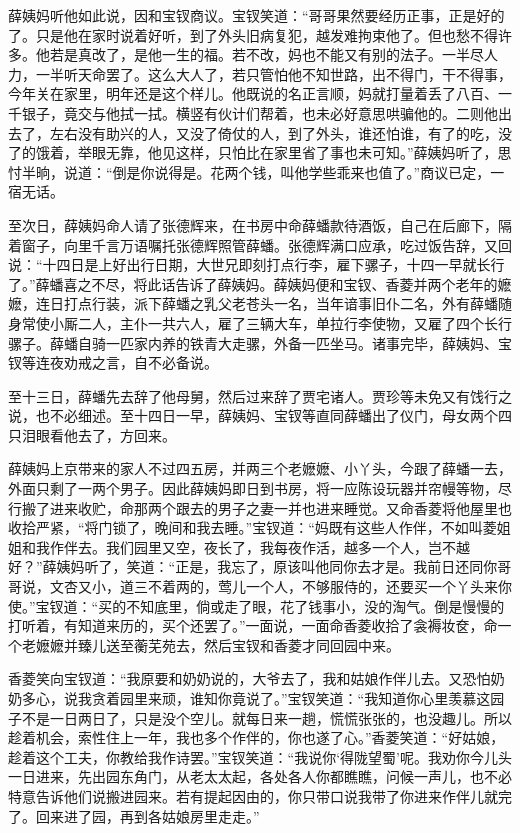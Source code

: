\documentclass[12pt,oneside]{book}
\begin{document}
薛姨妈听他如此说，因和宝钗商议。宝钗笑道：“哥哥果然要经历正事，正是好的了。只是他在家时说着好听，到了外头旧病复犯，越发难拘束他了。但也愁不得许多。他若是真改了，是他一生的福。若不改，妈也不能又有别的法子。一半尽人力，一半听天命罢了。这么大人了，若只管怕他不知世路，出不得门，干不得事，今年关在家里，明年还是这个样儿。他既说的名正言顺，妈就打量着丢了八百、一千银子，竟交与他拭一拭。横竖有伙计们帮着，也未必好意思哄骗他的。二则他出去了，左右没有助兴的人，又没了倚仗的人，到了外头，谁还怕谁，有了的吃，没了的饿着，举眼无靠，他见这样，只怕比在家里省了事也未可知。”薛姨妈听了，思忖半晌，说道：“倒是你说得是。花两个钱，叫他学些乖来也值了。”商议已定，一宿无话。

至次日，薛姨妈命人请了张德辉来，在书房中命薛蟠款待酒饭，自己在后廊下，隔着窗子，向里千言万语嘱托张德辉照管薛蟠。张德辉满口应承，吃过饭告辞，又回说：“十四日是上好出行日期，大世兄即刻打点行李，雇下骡子，十四一早就长行了。”薛蟠喜之不尽，将此话告诉了薛姨妈。薛姨妈便和宝钗、香菱并两个老年的嬷嬷，连日打点行装，派下薛蟠之乳父老苍头一名，当年谙事旧仆二名，外有薛蟠随身常使小厮二人，主仆一共六人，雇了三辆大车，单拉行李使物，又雇了四个长行骡子。薛蟠自骑一匹家内养的铁青大走骡，外备一匹坐马。诸事完毕，薛姨妈、宝钗等连夜劝戒之言，自不必备说。

至十三日，薛蟠先去辞了他母舅，然后过来辞了贾宅诸人。贾珍等未免又有饯行之说，也不必细述。至十四日一早，薛姨妈、宝钗等直同薛蟠出了仪门，母女两个四只泪眼看他去了，方回来。

薛姨妈上京带来的家人不过四五房，并两三个老嬷嬷、小丫头，今跟了薛蟠一去，外面只剩了一两个男子。因此薛姨妈即日到书房，将一应陈设玩器并帘幔等物，尽行搬了进来收贮，命那两个跟去的男子之妻一并也进来睡觉。又命香菱将他屋里也收拾严紧，“将门锁了，晚间和我去睡。”宝钗道：“妈既有这些人作伴，不如叫菱姐姐和我作伴去。我们园里又空，夜长了，我每夜作活，越多一个人，岂不越好？”薛姨妈听了，笑道：“正是，我忘了，原该叫他同你去才是。我前日还同你哥哥说，文杏又小，道三不着两的，莺儿一个人，不够服侍的，还要买一个丫头来你使。”宝钗道：“买的不知底里，倘或走了眼，花了钱事小，没的淘气。倒是慢慢的打听着，有知道来历的，买个还罢了。”一面说，一面命香菱收拾了衾褥妆奁，命一个老嬷嬷并臻儿送至蘅芜苑去，然后宝钗和香菱才同回园中来。

香菱笑向宝钗道：“我原要和奶奶说的，大爷去了，我和姑娘作伴儿去。又恐怕奶奶多心，说我贪着园里来顽，谁知你竟说了。”宝钗笑道：“我知道你心里羡慕这园子不是一日两日了，只是没个空儿。就每日来一趟，慌慌张张的，也没趣儿。所以趁着机会，索性住上一年，我也多个作伴的，你也遂了心。”香菱笑道：“好姑娘，趁着这个工夫，你教给我作诗罢。”宝钗笑道：“我说你‘得陇望蜀’呢。我劝你今儿头一日进来，先出园东角门，从老太太起，各处各人你都瞧瞧，问候一声儿，也不必特意告诉他们说搬进园来。若有提起因由的，你只带口说我带了你进来作伴儿就完了。回来进了园，再到各姑娘房里走走。”
\end{document}

